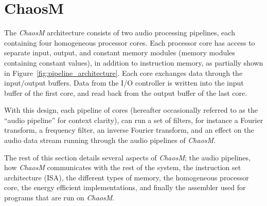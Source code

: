 
\FloatBarrier
\section{ChaosM}\label{chapter:fpga}

The \textit{ChaosM} architecture consists of two audio processing pipelines, each containing four
homogeneous processor cores. Each processor core has access to separate input, output, and constant memory modules (memory modules containing constant values), in addition to instruction memory, as partially shown in Figure~\ref{fig:pipeline_architecture}. Each core exchanges data
through the input/output buffers. Data from the I/O controller is written into
the input buffer of the first core, and read back from the output buffer of the
last core.

With this design, each pipeline of cores (hereafter occasionally referred to as the ``audio pipeline'' for context clarity), can run a set of filters, for instance
a Fourier transform, a frequency filter, an inverse Fourier transform, and an
effect on the audio data stream running through the audio pipelines of
\textit{ChaosM}.

The rest of this section details several aspects of \textit{ChaosM}; the audio
pipelines, how \textit{ChaosM} communicates with the rest of the system, the
instruction set architecture (ISA), the different types of memory, the homogeneous
processor core, the energy efficient implementations, and finally the assembler
used for programs that are run on \textit{ChaosM}.








